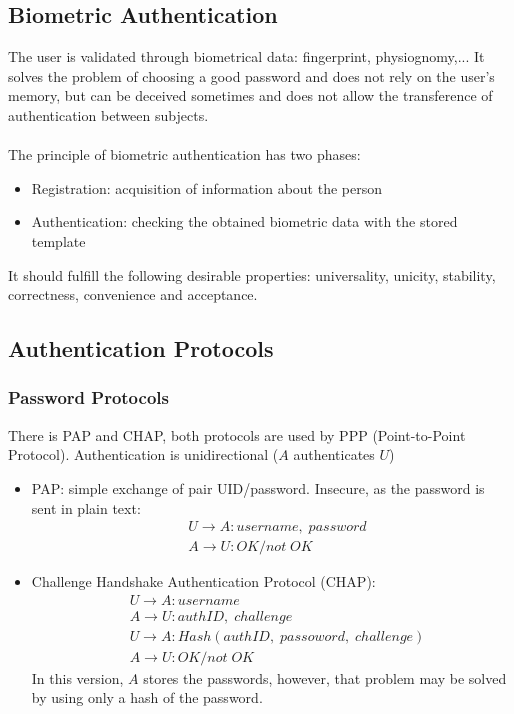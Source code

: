 \documentclass[10pt,a4paper]{report}
\begin{document}
\subsection{Biometric Authentication}
The user is validated through biometrical data: fingerprint, physiognomy,... It solves the problem of choosing a good password and does not rely on the user's memory, but can be deceived sometimes and does not  allow the transference of authentication between subjects.\\
\\
The principle of biometric authentication has two phases:
\begin{itemize}
\item Registration: acquisition of information about the person
\item Authentication: checking the obtained biometric data with the stored template
\end{itemize}
It should fulfill the following desirable properties: universality, unicity, stability, correctness, convenience and acceptance.
\subsection{Authentication Protocols}
\subsubsection{Password Protocols}
There is PAP and CHAP, both protocols are used by PPP (Point-to-Point Protocol). Authentication is unidirectional ($A$ authenticates $U$)
\begin{itemize}
\item PAP: simple exchange of pair UID/password. Insecure, as the password is sent in plain text:
\begin{align}
&U \rightarrow A: username,\; password\\
&A \rightarrow U: OK/not \; OK
\end{align}
\item Challenge Handshake Authentication Protocol (CHAP): 
\begin{align}
&U \rightarrow A: username\\
&A \rightarrow U: authID, \; challenge\\
&U \rightarrow A: Hash(authID,\; passoword,\; challenge)\\
&A \rightarrow U: OK/not \; OK
\end{align}
In this version, $A$ stores the passwords, however, that problem may be solved by using only a hash of the password.
\end{itemize}
\end{document}
